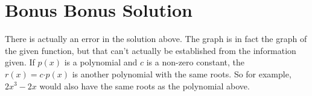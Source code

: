 \documentclass[11pt,a4paper]{report}
\theoremstyle{plain}
\theoremstyle{definition}
\theoremstyle{remark}
\begin{document}
\section*{Bonus Bonus Solution}
There is actually an error in the solution above. The graph is in fact the graph of the given function, but that can't actually be established from the information given.  If $p(x)$ is a polynomial and $c$ is a non-zero constant, the $r(x) = c \mathord{\cdot} p(x)$ is another polynomial with the same roots.  So for example, $2x^3 - 2x$ would also have the same roots as the polynomial above.
 
\end{document}
